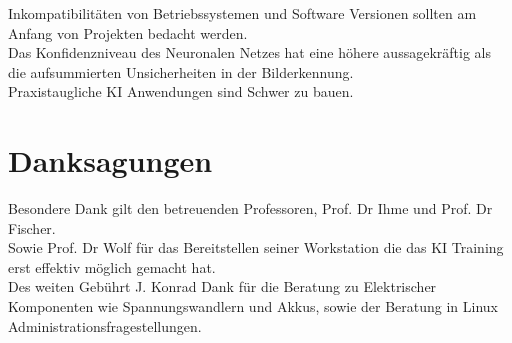 \documentclass[conference]{IEEEtran}
\begin{document}
Inkompatibilitäten von Betriebssystemen und Software Versionen sollten am 
Anfang von Projekten bedacht werden. \\

Das Konfidenzniveau des Neuronalen Netzes hat eine höhere aussagekräftig 
als die aufsummierten Unsicherheiten in der Bilderkennung.\\

Praxistaugliche KI Anwendungen sind Schwer zu bauen.

	
\section*{Danksagungen}

Besondere Dank gilt den betreuenden Professoren, Prof. Dr Ihme und Prof. 
Dr Fischer.\\
Sowie Prof. Dr Wolf für das Bereitstellen seiner Workstation die das KI 
Training erst effektiv möglich gemacht hat.\\
Des weiten Gebührt
 J. Konrad Dank für die Beratung zu Elektrischer 
Komponenten wie Spannungswandlern und Akkus, sowie der Beratung in 
Linux Administrationsfragestellungen.

	\printbibheading
	\printbibliography[filter=wissenschaftlich, heading=subbibliography, title={Fachliteratur}]
	\printbibliography[filter=nichtWissenschaftlich, heading=subbibliography, title={Web-Dokumente}]
	
\end{document}
